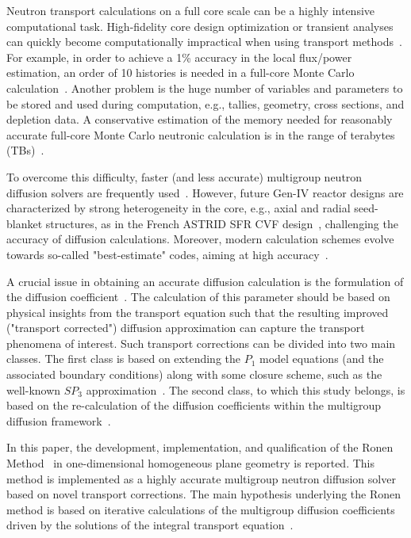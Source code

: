 Neutron transport calculations on a full core scale can be a highly intensive computational task. High-fidelity core design optimization or transient analyses can quickly become computationally impractical when using transport methods~\cite{Kim-2019}. For example, in order to achieve a 1\% accuracy in the local flux/power estimation, an order of 10 histories is needed in a full-core Monte Carlo calculation~\cite{Martin-2012}. Another problem is the huge number of variables and parameters to be stored and used during computation, e.g., tallies, geometry, cross sections, and depletion data. A conservative estimation of the memory needed for reasonably accurate full-core Monte Carlo neutronic calculation is in the range of terabytes (TBs)~\cite{Martin-2012}. 


To overcome this difficulty, faster (and less accurate) multigroup neutron diffusion solvers are frequently  used~\cite{Lawrence-1986,Smith-1986}. However, future Gen-IV reactor designs are characterized by strong heterogeneity in the core, e.g., axial and radial seed-blanket structures, as in the French ASTRID SFR CVF design~\cite{Bertrand-2016}, challenging the accuracy of diffusion calculations. Moreover, modern calculation schemes evolve towards so-called "best-estimate" codes, aiming at high accuracy~\cite{IAEA-BE-2008}. 

A crucial issue in obtaining an accurate diffusion calculation is the formulation of the diffusion coefficient~\cite{Bell-1970,Pounders-2009}. The calculation of this parameter should be based on physical insights from the transport equation such that the resulting improved ("transport corrected") diffusion approximation can capture the transport phenomena of interest. Such transport corrections can be divided into two main classes. The first class is based on extending the $P_1$ model equations (and the associated boundary conditions) along with some closure scheme, such as the well-known $SP_3$ approximation~\cite{Brantley-2000}. The second class, to which this study belongs, is based on the re-calculation of the diffusion coefficients within the multigroup diffusion framework~\cite{Tomatis-2011}. 

In this paper, the development, implementation, and qualification of the Ronen Method~\cite{Ronen-2004} in one-dimensional homogeneous plane geometry is reported. This method is implemented as a highly accurate multigroup neutron diffusion solver based on novel transport corrections. The main hypothesis underlying the Ronen method is based on iterative calculations of the multigroup diffusion coefficients driven by the solutions of the integral transport equation~\cite{Ronen-2004,Tomatis-2011}. 

